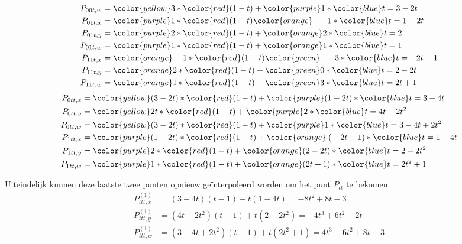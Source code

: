 \documentclass{report}
\begin{document}
\begin{enumerate}
{\begin{itemize}
\begin{equation*}
\begin{split}
					P_{00t, w} & = {\color{yellow}3} * {\color{red}(1 - t)} + {\color{purple}1} * {\color{blue}t} = 3 - 2t\\
					P_{01t, x} & = {\color{purple}1} * {\color{red}(1 - t)} {\color{orange}\;- \;1} * {\color{blue}t} = 1 - 2t \\
					P_{01t, y} & = {\color{purple}2} * {\color{red}(1 - t)} + {\color{orange}2} * {\color{blue}t} = 2 \\
					P_{01t, w} & = {\color{purple}1} * {\color{red}(1 - t)} + {\color{orange}1} * {\color{blue}t} = 1 \\
					P_{11t, x} & = {\color{orange}- 1} * {\color{red}(1 - t)} {\color{green}\;-\;3} * {\color{blue}t} = -2t - 1 \\
					P_{11t, y} & = {\color{orange}2} * {\color{red}(1 - t)} + {\color{green}0} * {\color{blue}t} = 2 - 2t \\
					P_{11t, w} & = {\color{orange}1} * {\color{red}(1 - t)} + {\color{green}3} * {\color{blue}t} = 2t + 1 \\
				\end{split}
			\end{equation*}
			\begin{equation*}
				\begin{split}
					P_{0tt, x} & = {\color{yellow}(3-2t)} * {\color{red}(1 - t)} + {\color{purple}(1 - 2t)} * {\color{blue}t} = 3 - 4t \\
					P_{0tt, y} & = {\color{yellow}2t} * {\color{red}(1 - t)} + {\color{purple}2} * {\color{blue}t} = 4t - 2t^2 \\
					P_{0tt, w} & = {\color{yellow}(3 - 2t)} * {\color{red}(1 - t)} + {\color{purple}1} * {\color{blue}t} = 3 - 4t +2t^2\\
					P_{1tt, x} & = {\color{purple}(1 - 2t)} * {\color{red}(1 - t)} + {\color{orange}\;(-\;2t - 1)} * {\color{blue}t} = 1 - 4t \\
					P_{1tt, y} & = {\color{purple}2} * {\color{red}(1 - t)} + {\color{orange}(2 - 2t)} * {\color{blue}t} = 2 -2t^2 \\
					P_{1tt, w} & = {\color{purple}1} * {\color{red}(1 - t)} + {\color{orange}(2t + 1)} * {\color{blue}t} = 2t^2 + 1 \\
				\end{split}
			\end{equation*}

			Uiteindelijk kunnen deze laatste twee punten opnieuw geïnterpoleerd worden om het punt $P_{tt}$ te bekomen.
			\begin{equation*}
				\begin{split}
					P_{ttt, x}^{(1)} & = (3-4t)(t-1) + t(1-4t) = -8t^2 +8t - 3 \\
					P_{ttt, y}^{(1)} & = (4t-2t^2)(t-1)+ t(2-2t^2) = -4t^3 + 6t^2 - 2t\\
					P_{ttt, w}^{(1)} & = (3-4t+2t^2)(t-1) + t(2t^2 + 1) = 4t^3 -6t^2 +8t - 3
				\end{split}
			\end{equation*}


\end{itemize}}
\end{enumerate}
\end{document}
